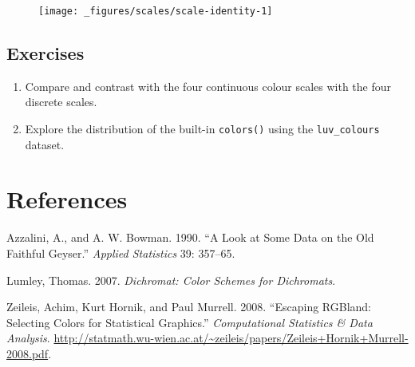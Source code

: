 \begin{Shaded}
\begin{Highlighting}[]

\StringTok{ }
\StringTok{  }\NormalTok{(}\NormalTok{(}  \NormalTok{) +}\StringTok{ }
\StringTok{  }\NormalTok{() +}\StringTok{ }
\StringTok{  }\NormalTok{()}
\end{Highlighting}
\end{Shaded}

\begin{figure}[H]
  \centering
  \texttt{[image: \_figures/scales/scale-identity-1]}
\end{figure}

\subsection{Exercises}

\begin{enumerate}
\def\labelenumi{\arabic{enumi}.}
\item
  Compare and contrast with the four continuous colour scales with the
  four discrete scales.
\item
  Explore the distribution of the built-in \texttt{colors()} using the
  \texttt{luv\_colours} dataset.
\end{enumerate}

\section*{References}

Azzalini, A., and A. W. Bowman. 1990. ``A Look at Some Data on the Old
Faithful Geyser.'' \emph{Applied Statistics} 39: 357--65.

Lumley, Thomas. 2007. \emph{Dichromat: Color Schemes for Dichromats}.

Zeileis, Achim, Kurt Hornik, and Paul Murrell. 2008. ``Escaping RGBland:
Selecting Colors for Statistical Graphics.'' \emph{Computational
Statistics \& Data Analysis}.
\url{http://statmath.wu-wien.ac.at/~zeileis/papers/Zeileis+Hornik+Murrell-2008.pdf}.
